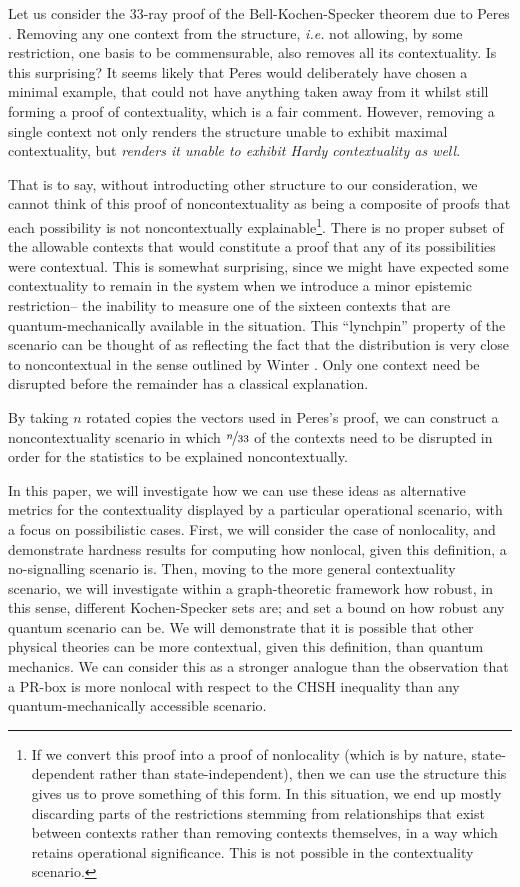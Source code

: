\documentclass{amsart}
\theoremstyle{definition}
\begin{document}
Let us consider the 33-ray proof of the Bell-Kochen-Specker theorem due to Peres \cite{Pere1991}. Removing any one context from the structure, \emph{i.e.} not allowing, by some restriction, one basis to be commensurable, also removes all its contextuality. Is this surprising? It seems likely that Peres would deliberately have chosen a minimal example, that could not have anything taken away from it whilst still forming a proof of contextuality, which is a fair comment. However, removing a single context not only renders the structure unable to exhibit maximal contextuality, but \emph{renders it unable to exhibit Hardy contextuality as well}.

That is to say, without introducting other structure to our consideration, we cannot think of this proof of noncontextuality as being a composite of proofs that each possibility is not noncontextually explainable\footnote{If we convert this proof into a proof of nonlocality (which is by nature, state-dependent rather than state-independent), then we can use the structure this gives us to prove something of this form. In this situation, we end up mostly %
discarding parts of the restrictions stemming from relationships that exist between contexts rather than removing contexts themselves, in a way which retains operational significance. This is not possible in the contextuality scenario.}. There is no proper subset of the allowable contexts that would constitute a proof that any of its possibilities were contextual. This is somewhat surprising, since we might have expected some contextuality to remain in the system when we introduce a minor epistemic restriction-- the inability to measure one of the sixteen contexts that are quantum-mechanically available in the situation. This ``lynchpin'' property of the scenario can be thought of as reflecting the fact that the distribution is very close to noncontextual in the sense outlined by Winter \cite{Wint2014}. Only one context need be disrupted before the remainder has a classical explanation.

By taking $n$ rotated copies the vectors used in Peres's proof, we can construct a noncontextuality scenario in which $\nicefrac{n}{33}$ of the contexts need to be disrupted in order for the statistics to be explained noncontextually.

In this paper, we will investigate how we can use these ideas as alternative metrics for the contextuality displayed by a particular operational scenario, with a focus on possibilistic cases. First, we will consider the case of nonlocality, and demonstrate hardness results for computing how nonlocal, given this definition, a no-signalling scenario is. Then, moving to the more general contextuality scenario, we will investigate within a graph-theoretic framework how robust, in this sense, different Kochen-Specker sets are; and set a bound on how robust any quantum scenario can be. We will demonstrate that it is possible that other physical theories can be more contextual, given this definition, than quantum mechanics. We can consider this as a stronger analogue than the observation that a PR-box is more nonlocal with respect to the CHSH inequality than any quantum-mechanically accessible scenario.
\end{document}
